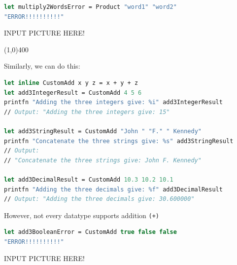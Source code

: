 \documentclass[12pt]{article}
\begin{document}
\begin{lstlisting}[language=FSharp]
let multiply2WordsError = Product "word1" "word2"
"ERROR!!!!!!!!!!"
\end{lstlisting}
\begin{center}
INPUT PICTURE HERE!
\end{center}
\begin{center}
\line(1,0){400}
\end{center}
Similarly, we can do this:
\begin{lstlisting}[language=FSharp]
let inline CustomAdd x y z = x + y + z
let add3IntegerResult = CustomAdd 4 5 6
printfn "Adding the three integers give: %i" add3IntegerResult
// Output: "Adding the three integers give: 15"

let add3StringResult = CustomAdd "John " "F." " Kennedy"
printfn "Concatenate the three strings give: %s" add3StringResult
// Output:
// "Concatenate the three strings give: John F. Kennedy"

let add3DecimalResult = CustomAdd 10.3 10.2 10.1
printfn "Adding the three decimals give: %f" add3DecimalResult
// Output: "Adding the three decimals give: 30.600000"
\end{lstlisting}
However, not every datatype supports addition \texttt{(+)}
\begin{lstlisting}[language=FSharp]
let add3BooleanError = CustomAdd true false false
"ERROR!!!!!!!!!!"
\end{lstlisting}
\begin{center}
INPUT PICTURE HERE!
\end{center}
\end{document}
